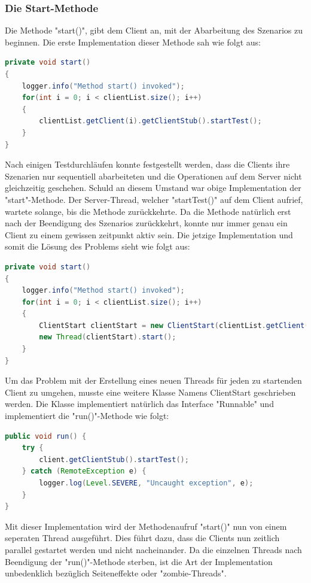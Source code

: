 \subsubsection{Die Start-Methode}
\label{sec:startMethode}

Die Methode "start()", gibt dem Client an, mit der Abarbeitung des Szenarios zu beginnen. Die erste Implementation dieser Methode sah wie folgt aus:
\begin{lstlisting}[language=java, breaklines=true]
private void start()
{
	logger.info("Method start() invoked");
	for(int i = 0; i < clientList.size(); i++)
	{
		clientList.getClient(i).getClientStub().startTest();
	}
}
\end{lstlisting}

Nach einigen Testdurchläufen konnte festgestellt werden, dass die Clients ihre Szenarien nur sequentiell abarbeiteten und die Operationen auf dem Server nicht gleichzeitig geschehen. Schuld an diesem Umstand war obige Implementation der "start"-Methode. Der Server-Thread, welcher "startTest()" auf dem Client aufrief, wartete solange, bis die Methode zurückkehrte. Da die Methode natürlich erst nach der Beendigung des Szenarios zurückkehrt, konnte nur immer genau ein Client zu einem gewissen zeitpunkt aktiv sein.\newline
Die jetzige Implementation und somit die Lösung des Problems sieht wie folgt aus:
\begin{lstlisting}[language=java, breaklines=true]
private void start()
{
	logger.info("Method start() invoked");
	for(int i = 0; i < clientList.size(); i++)
	{
		ClientStart clientStart = new ClientStart(clientList.getClient(i));
		new Thread(clientStart).start();
	}
}
\end{lstlisting}
Um das Problem mit der Erstellung eines neuen Threads für jeden zu startenden Client zu umgehen, musste eine weitere Klasse Namens ClientStart ge\-schrie\-ben wer\-den. Die Klas\-se im\-p\-le\-men\-tiert natür\-lich das Inter\-face "Run\-nable" und im\-p\-le\-men\-tiert die "run()"-Methode wie folgt:
\begin{lstlisting}[language=java, breaklines=true]
public void run() {
	try {
		client.getClientStub().startTest();
	} catch (RemoteException e) {
		logger.log(Level.SEVERE, "Uncaught exception", e);
	}
}
\end{lstlisting}

Mit dieser Implementation wird der Methodenaufruf "start()" nun von einem seperaten Thread ausgeführt. Dies führt dazu, dass die Clients nun zeitlich parallel gestartet werden und nicht nacheinander. Da die einzelnen Threads nach Beendigung der "run()"-Methode sterben, ist die Art der Implementation unbedenklich bezüglich Seiteneffekte oder "zombie-Threads".

